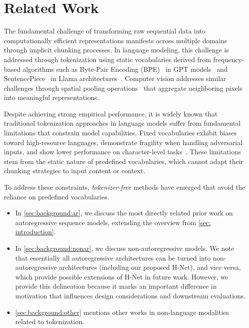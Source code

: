 \section{Related Work}
\label{sec: background}

The fundamental challenge of transforming raw sequential data into computationally efficient representations manifests across multiple domains through implicit chunking processes.
In language modeling, this challenge is addressed through tokenization using static vocabularies derived from frequency-based algorithms such as Byte-Pair Encoding (BPE)~\citep{BPE} in GPT models~\citep{GPT2, GPT3} and SentencePiece~\citep{SentencePiece} in Llama architectures~\citep{Llama2, Llama3}.
Computer vision addresses similar challenges through spatial pooling operations~\citep{U-Net} that aggregate neighboring pixels into meaningful representations.

Despite achieving strong empirical performance, it is widely known that traditional tokenization approaches in language models suffer from fundamental limitations that constrain model capabilities.
Fixed vocabularies exhibit biases toward high-resource languages, demonstrate fragility when handling adversarial inputs, and show lower performance on character-level tasks~\citep{petrov2023language, ahia2023all, belinkov2017synthetic, Adv-BERT, ByT5}.
These limitations stem from the static nature of predefined vocabularies, which cannot adapt their chunking strategies to input content or context.

To address these constraints, \emph{tokenizer-free} methods have emerged that avoid the reliance on predefined vocabularies.

\begin{itemize}
    \item In \cref{sec:background:ar}, we discuss the most directly related prior work on autoregressive sequence models, extending the overview from \cref{sec: introduction}.
    \item In \cref{sec:background:nonar}, we discuss non-autoregressive models. We note that essentially all autoregressive architectures can be turned into non-autoregressive architectures (including our proposed H-Net), and vice versa, which provide possible extensions of H-Net in future work. However, we provide this delineation because it marks an important difference in motivation that influences design considerations and downstream evaluations.
    \item \cref{sec:background:other} mentions other works in non-language modalities related to tokenization.
\end{itemize}


